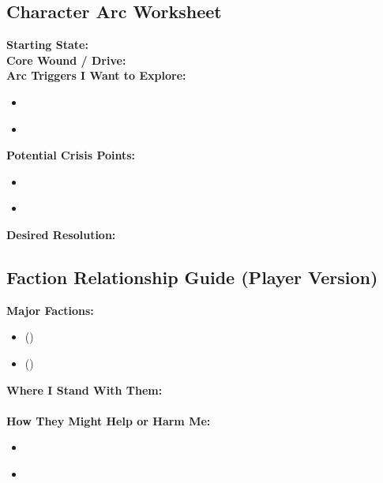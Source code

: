 \documentclass[11pt]{article}
\begin{document}
\subsection{Character Arc Worksheet}

\begin{tcolorbox}[
  title=\textbf{Character Arc Worksheet},
  colback=gray!10,
  colframe=black,
  fonttitle=\bfseries,
  sharp corners,
  enhanced
,breakable]

\textbf{Starting State:} \underline{\phantom{XXXXXXXXXXXXXX}} \\

\textbf{Core Wound / Drive:} \underline{\phantom{XXXXXXXXXXXXXX}} \\

\textbf{Arc Triggers I Want to Explore:}
\begin{itemize}
  \item \underline{\phantom{Trigger}}
  \item \underline{\phantom{Trigger}}
\end{itemize}

\textbf{Potential Crisis Points:}
\begin{itemize}
  \item \underline{\phantom{Crisis}}
  \item \underline{\phantom{Crisis}}
\end{itemize}

\textbf{Desired Resolution:} \underline{\phantom{XXXXXXXXXXXXXXXX}} \\

\end{tcolorbox}

\subsection{Faction Relationship Guide (Player Version)}

\begin{tcolorbox}[
  title=\textbf{Faction Relationship Guide},
  colback=gray!10,
  colframe=black,
  fonttitle=\bfseries,
  sharp corners,
  enhanced
,breakable]
\textbf{Major Factions:}
\begin{itemize}
  \item \underline{\phantom{Faction}} (\underline{\phantom{Attitude}})
  \item \underline{\phantom{Faction}} (\underline{\phantom{Attitude}})
\end{itemize}

\textbf{Where I Stand With Them:} \\
\underline{\phantom{XXXXXXXXXXXXXXXXXXXXXXXXXXXXXXXXXX}} \\

\textbf{How They Might Help or Harm Me:}
\begin{itemize}
  \item \underline{\phantom{Help/Harm}}
  \item \underline{\phantom{Help/Harm}}
\end{itemize}
\end{tcolorbox}
\end{document}
